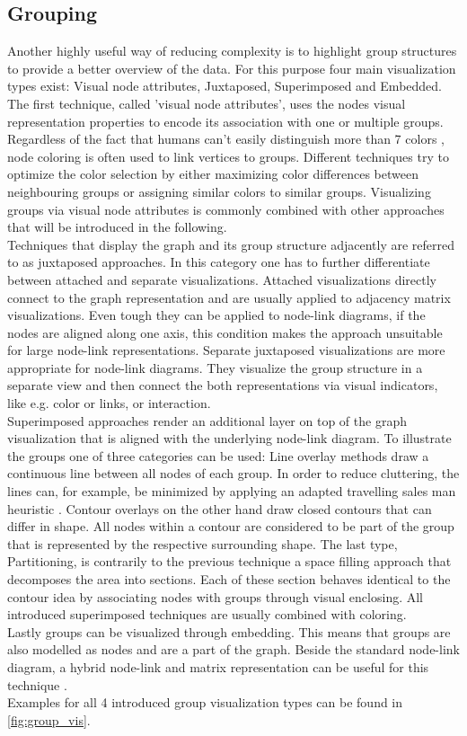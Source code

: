 \subsection{Grouping}
Another highly useful way of reducing complexity is to highlight group structures to provide a better overview of the data. For this purpose four main visualization types exist: Visual node attributes, Juxtaposed, Superimposed and Embedded.\\
The first technique, called 'visual node attributes', uses the nodes visual representation properties to encode its association with one or multiple groups. Regardless of the fact that humans can't easily distinguish more than 7 colors \cite{Healey1996}, node coloring is often used to link vertices to groups. Different techniques try to optimize the color selection by either maximizing color differences between neighbouring groups or assigning similar colors to similar groups. Visualizing groups via visual node attributes is commonly combined with other approaches that will be introduced in the following.\\
Techniques that display the graph and its group structure adjacently are referred to as juxtaposed approaches. In this category one has to further differentiate between attached and separate visualizations. Attached visualizations directly connect to the graph representation and are usually applied to adjacency matrix visualizations. Even tough they can be applied to node-link diagrams, if the nodes are aligned along one axis, this condition makes the approach unsuitable for large node-link representations.
Separate juxtaposed visualizations are more appropriate for node-link diagrams. They visualize the group structure in a separate view and then connect the both representations via visual indicators, like e.g. color or links, or interaction.\\
Superimposed approaches render an additional layer on top of the graph visualization that is aligned with the underlying node-link diagram. To illustrate the groups one of three categories can be used: Line overlay methods draw a continuous line between all nodes of each group. In order to reduce cluttering, the lines can, for example, be minimized by applying an adapted travelling sales man heuristic \cite{Alper2011}. Contour overlays on the other hand draw closed contours that can differ in shape. All nodes within a contour are considered to be part of the group that is represented by the respective surrounding shape.
The last type, Partitioning, is contrarily to the previous technique a space filling approach that decomposes the area into sections. Each of these section behaves identical to the contour idea by associating nodes with groups through visual enclosing. All introduced superimposed techniques are usually combined with coloring.\\
Lastly groups can be visualized through embedding. This means that groups are also modelled as nodes and are a part of the graph. Beside the standard node-link diagram, a hybrid node-link and matrix representation can be useful for this technique \cite{Vehlow2015}.\\
Examples for all 4 introduced group visualization types can be found in \autoref{fig:group_vis}. 

